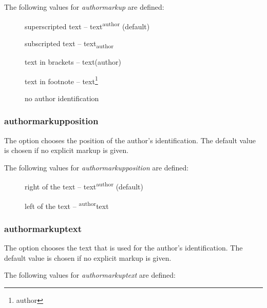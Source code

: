 The following values for \emph{authormarkup} are defined:

\begin{description}
	\item [] superscripted text -- text\textsuperscript{author} (default)
	\item [] subscripted text -- text\textsubscript{author}
	\item [] text in brackets -- text(author)
	\item [] text in footnote -- text\footnote{author}
	\item [] no author identification
\end{description}



\subsubsection{authormarkupposition}


The  option chooses the position of the author's identification.
The default value is chosen if no explicit markup is given.

The following values for \emph{authormarkupposition} are defined:

\begin{description}
	\item [] right of the text -- text\textsuperscript{author} (default)
	\item [] left of the text -- \textsuperscript{author}text
\end{description}




\subsubsection{authormarkuptext}


The  option chooses the text that is used for the author's identification.
The default value is chosen if no explicit markup is given.

The following values for \emph{authormarkuptext} are defined:

